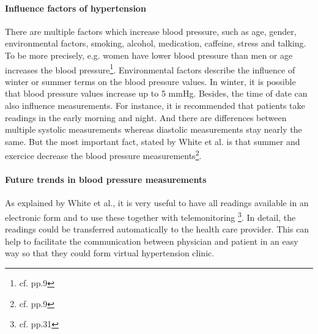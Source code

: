 \paragraph{Influence factors of hypertension}
There are multiple factors which increase blood pressure, such as age, gender, environmental factors, smoking, alcohol, medication, caffeine, stress and talking.
To be more precisely, e.g. women have lower blood pressure than men or age increases the blood pressure\footnote{cf.\autocite{white_blood_2007} pp.9}. Environmental factors describe the influence of winter or summer terms on the blood pressure values. In winter, it is possible that blood pressure values increase up to 5 mmHg. Besides, the time of date can also influence measurements. For instance, it is recommended that patients take readings in the early morning and night. And there are differences between multiple systolic measurements whereas diastolic measurements stay nearly the same. But the most important fact, stated by White et al. is that summer and exercice decrease the blood pressure measurements\footnote{cf.\autocite{white_blood_2007} pp.9}.

\paragraph{Future trends in blood pressure measurements}
As explained by White et al., it is very useful to have all readings available in an electronic form and to use these together with telemonitoring \footnote{cf.\autocite{white_blood_2007} pp.31}. In detail, the readings could be transferred automatically to the health care provider. This can help to facilitate the communication between physician and patient in an easy way so that they could form virtual hypertension clinic.

